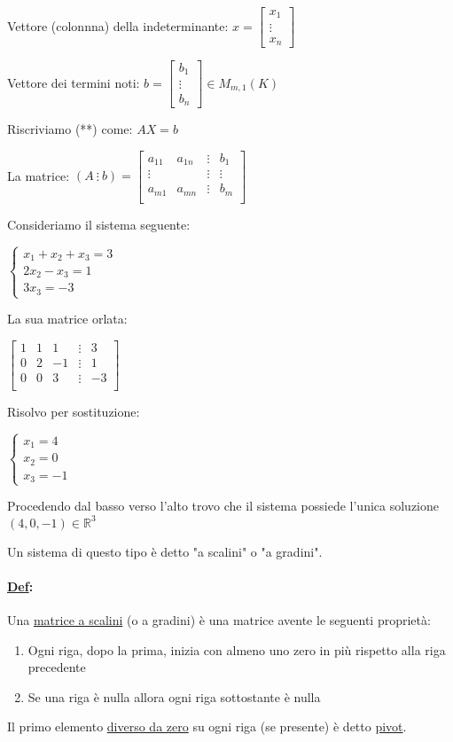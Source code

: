 \documentclass{article}
\newcommand{\ul}[1]{\underline{#1}}
\newcommand{\R}{\mathbb{R}}
\newcommand{\Def}[2]{\paragraph{\ul{Def}:}#1\\\hspace*{3em}\begin{minipage}{.8\textwidth}#2\end{minipage}}
\begin{document}
Vettore (colonnna) della indeterminante:
$x=\begin{bmatrix}x_1\\\vdots\\x_n\end{bmatrix}$

Vettore dei termini noti: $b=\begin{bmatrix}b_1\\\vdots\\b_n\end{bmatrix}\in M_{m,1}(K)$

Riscriviamo (**) come:
$AX=b$

La matrice: $(A\ \vdots\ b)=\begin{bmatrix}
	a_{11} & a_{1n} & \vdots & b_1    \\
	\vdots &        & \vdots & \vdots \\
	a_{m1} & a_{mn} & \vdots & b_m    \\
\end{bmatrix}$

Consideriamo il sistema seguente:

$\begin{cases}
	x_1+x_2+x_3=3 \\
	2x_2-x_3=1    \\
	3x_3=-3
\end{cases}$

La sua matrice orlata:

$\begin{bmatrix}
	1 & 1 & 1  & \vdots & 3  \\
	0 & 2 & -1 & \vdots & 1  \\
	0 & 0 & 3  & \vdots & -3 \\
\end{bmatrix}$

Risolvo per sostituzione:

$\begin{cases}
	x_1=4 \\
	x_2=0 \\
	x_3=-1
\end{cases}$

Procedendo dal basso verso l'alto trovo che il sistema possiede l'unica soluzione $(4,0,-1)\in\R^3$

Un sistema di questo tipo è detto "a scalini" o "a gradini".

\Def{Una \ul{matrice a scalini} (o a gradini) è una matrice avente le seguenti proprietà:}{
	\begin{enumerate}
		\item Ogni riga, dopo la prima, inizia con almeno uno zero in più rispetto alla riga precedente
		\item Se una riga è nulla allora ogni riga sottostante è nulla
	\end{enumerate}
}
Il primo elemento \ul{diverso da zero} su ogni riga (se presente) è detto \ul{pivot}.
\end{document}
